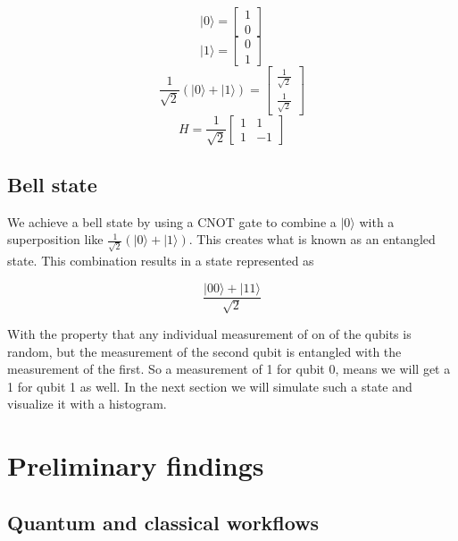 \documentclass{article}
\newcommand{\ket}[1]{{\lvert #1 \rangle}}
\begin{document}
$$
\ket{0} = 
\begin{bmatrix}
1 \\
0
\end{bmatrix}
$$
$$
\ket{1} =
\begin{bmatrix}
0 \\
1
\end{bmatrix}
$$
$$
\frac{1}{\sqrt{2}}(\ket{0}+\ket{1}) = 
\begin{bmatrix}
    \frac{1}{\sqrt{2}}\\
    \frac{1}{\sqrt{2}}
\end{bmatrix}
$$
$$
H = \frac{1}{\sqrt{2}}
\begin{bmatrix}
    1 & 1 \\
    1 & -1
\end{bmatrix}
$$

\subsection{Bell state}

We achieve a bell state by using a CNOT gate to combine a $\ket{0}$ with a superposition like 
$\frac{1}{\sqrt{2}}(\ket{0}+\ket{1})$. This creates what is known as an entangled state. This combination results in a state represented as 

$$
\frac{\ket{00}+\ket{11}}{\sqrt{2}}
$$

With the property that any individual measurement of on of the qubits is random, but the measurement of the second qubit is entangled with the measurement of the first. So a measurement of 1 for qubit 0, means we will get a 1 for qubit 1 as well. In the next section we will simulate such a state and visualize it with a histogram.




\section{Preliminary findings}

\subsection{Quantum and classical workflows}
\end{document}
